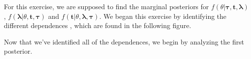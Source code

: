 For this exercise, we are supposed to find the marginal posteriors for $f(\theta| \boldsymbol{\tau}, \boldsymbol{t}, \boldsymbol{\lambda})$, $f(\boldsymbol{\lambda}|\theta,\boldsymbol{t},\boldsymbol{\tau})$ and $f(\boldsymbol{t}|\theta, \boldsymbol{\lambda},\boldsymbol{\tau})$. We began this exercise by identifying the different dependences , which are found in the following figure. 
  \begin{center}
  \end{center}
Now that we've identified all of the dependences, we begin by analyzing the first posterior.
